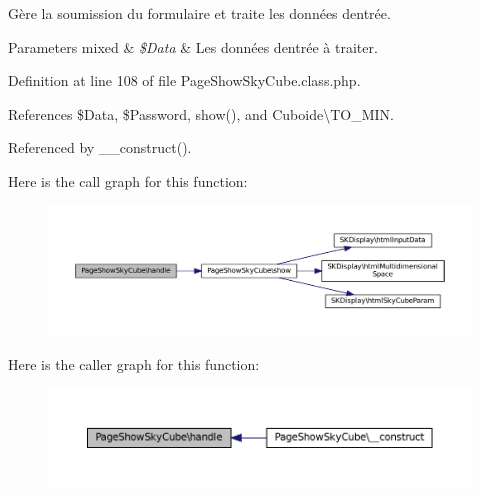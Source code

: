 Gère la soumission du formulaire et traite les données d\textquotesingle{}entrée.


\begin{DoxyParams}[1]{Parameters}
mixed & {\em \$\+Data} & Les données d\textquotesingle{}entrée à traiter. \\
\hline
\end{DoxyParams}


Definition at line 108 of file Page\+Show\+Sky\+Cube.\+class.\+php.



References \$\+Data, \$\+Password, show(), and Cuboide\textbackslash{}\+T\+O\+\_\+\+M\+IN.



Referenced by \+\_\+\+\_\+construct().

Here is the call graph for this function\+:\nopagebreak
\begin{figure}[H]
\begin{center}
\leavevmode
\includegraphics[width=350pt]{class_page_show_sky_cube_aff86dfb051c5c4bdba1226b3a6f7bfc0_cgraph}
\end{center}
\end{figure}
Here is the caller graph for this function\+:\nopagebreak
\begin{figure}[H]
\begin{center}
\leavevmode
\includegraphics[width=350pt]{class_page_show_sky_cube_aff86dfb051c5c4bdba1226b3a6f7bfc0_icgraph}
\end{center}
\end{figure}
\mbox{\label{class_page_show_sky_cube_aea6c5561569163e3d33d75dea4635a3d}} 
